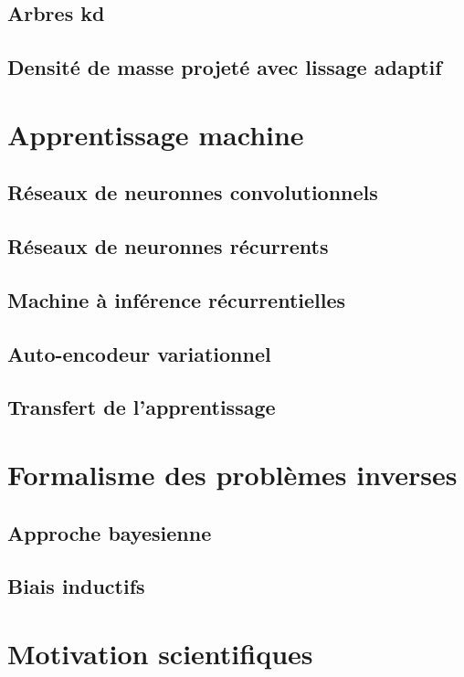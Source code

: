 \subsection{Arbres kd}

\subsection{Densité de masse projeté avec lissage adaptif}


\section{Apprentissage machine}\label{sec:apprentissage machine}

\subsection{Réseaux de neuronnes convolutionnels}

\subsection{Réseaux de neuronnes récurrents}

\subsection{Machine à inférence récurrentielles}

\subsection{Auto-encodeur variationnel}

\subsection{Transfert de l'apprentissage}


\section{Formalisme des problèmes inverses}\label{sec:formalisme probleme inverse}

\subsection{Approche bayesienne}

\subsection{Biais inductifs}

\subsection{}


\section{Motivation scientifiques}\label{sec:motivations}



